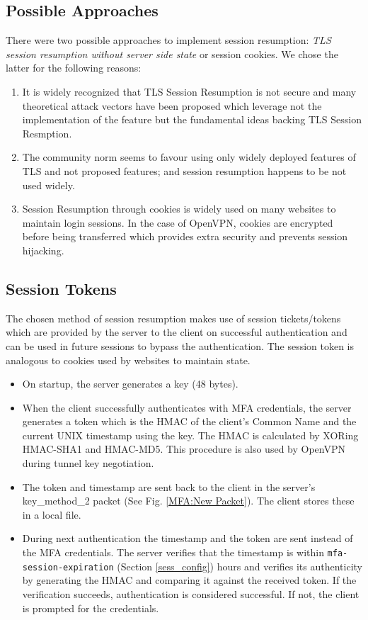 \documentclass[11pt,oneside]{book}
\begin{document}
\subsection{Possible Approaches}
There were two possible approaches to implement session resumption: \emph{TLS session resumption without
server side state\cite{RFC5077}} or session cookies. We chose the latter for the following reasons:

\begin{enumerate}
    \item It is widely recognized that TLS Session Resumption is not secure and many theoretical
        attack vectors\cite{TLS_Insecure} have been proposed which leverage not the implementation
        of the feature but the fundamental ideas backing TLS Session Resmption.
    \item The community norm seems to favour using only widely deployed features of TLS and not
        proposed features; and session resumption happens to be not used widely.
    \item Session Resumption through cookies is widely used on many websites to maintain login
        sessions. In the case of OpenVPN, cookies are encrypted before being transferred which
        provides extra security and prevents session hijacking.
\end{enumerate}

\subsection{Session Tokens}
The chosen method of session resumption makes use of session tickets/tokens which are provided by
the server to the client on successful authentication and can be used in future sessions to bypass
the authentication. The session token is analogous to cookies used by websites to maintain state.

\begin{itemize}
    \item On startup, the server generates a key (48 bytes).
    \item When the client successfully authenticates with MFA credentials, the server generates a
        token which is the  HMAC \cite{RFC2104} of the client's Common Name and the current UNIX
        timestamp using the key. The HMAC is calculated by XORing HMAC-SHA1 and HMAC-MD5. This
        procedure is also used by OpenVPN during tunnel key negotiation.
    \item The token and timestamp are sent back to the client in the server's key\_method\_2 packet
        (See Fig. \ref{MFA:New Packet}). The client stores these in a local file.
    \item During next authentication the timestamp and the token are sent instead of the MFA
        credentials. The server verifies that the timestamp is within {\tt mfa-session-expiration}
        (Section \ref{sess_config}) hours and verifies its authenticity by generating the HMAC and
        comparing it against the received token. If the verification succeeds, authentication is
        considered successful. If not, the client is prompted for the credentials.
\end{itemize}
\end{document}
